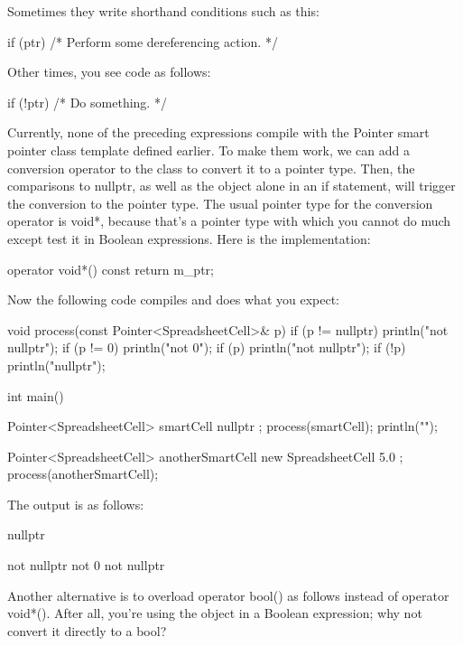 Sometimes they write shorthand conditions such as this:

\begin{cpp}
if (ptr) { /* Perform some dereferencing action. */ }
\end{cpp}

Other times, you see code as follows:

\begin{cpp}
if (!ptr) { /* Do something. */ }
\end{cpp}

Currently, none of the preceding expressions compile with the Pointer smart pointer class template defined earlier. To make them work, we can add a conversion operator to the class to convert it to a pointer type. Then, the comparisons to nullptr, as well as the object alone in an if statement, will trigger the conversion to the pointer type. The usual pointer type for the conversion operator is void*, because that’s a pointer type with which you cannot do much except test it in Boolean expressions. Here is the implementation:

\begin{cpp}
operator void*() const { return m_ptr; }
\end{cpp}

Now the following code compiles and does what you expect:

\begin{cpp}
void process(const Pointer<SpreadsheetCell>& p)
{
    if (p != nullptr) { println("not nullptr"); }
    if (p != 0)       { println("not 0"); }
    if (p)            { println("not nullptr"); }
    if (!p)           { println("nullptr"); }
}

int main()
{
    Pointer<SpreadsheetCell> smartCell { nullptr };
    process(smartCell);
    println("");

    Pointer<SpreadsheetCell> anotherSmartCell { new SpreadsheetCell { 5.0 } };
    process(anotherSmartCell);
}
\end{cpp}

The output is as follows:

\begin{shell}
nullptr

not nullptr
not 0
not nullptr
\end{shell}

Another alternative is to overload operator bool() as follows instead of operator void*(). After all, you’re using the object in a Boolean expression; why not convert it directly to a bool?

